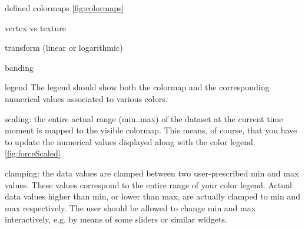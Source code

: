 defined colormaps \ref{fig:colormaps}
 
vertex vs texture

transform (linear or logarithmic)

banding 

legend  The legend should show both the colormap and the corresponding numerical values associated to various colors.

scaling: the entire actual range (min..max) of the dataset at the current time moment is mapped to the visible colormap. This means, of course, that you have to update the numerical values displayed along with the color legend.
\ref{fig:forceScaled}

clamping: the data values are clamped between two user-prescribed min and max values. These values correspond to the entire range of your color legend. Actual data values higher than min, or lower than max, are actually clamped to min and max respectively. The user should be allowed to change min and max interactively, e.g. by means of some sliders or similar widgets.
 
